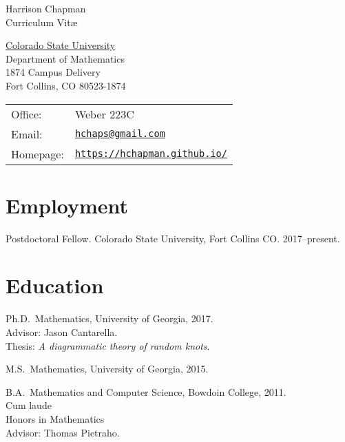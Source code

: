 \documentclass[letterpaper]{article}
\def\name{Harrison Chapman}
\renewenvironment{itemize}{
  \begin{list}{}{
    \setlength{\leftmargin}{1.5em}
  }
}{
  \end{list}
}
\begin{document}
{\huge \name}\\
{\large\sc Curriculum Vit\ae}


\vspace{0.25in}

\begin{minipage}{0.45\linewidth}
  \href{http://www.colostate.edu/}{Colorado State University} \\
  Department of Mathematics \\
  1874 Campus Delivery \\
  Fort Collins, CO 80523-1874
\end{minipage}
\begin{minipage}{0.45\linewidth}
  \begin{tabular}{ll}
    Office: & Weber 223C \\
    Email: & \href{mailto:hchaps@gmail.com}{\tt hchaps@gmail.com} \\
    Homepage: & \href{https://hchapman.github.io/}{\tt https://hchapman.github.io/} \\
  \end{tabular}
\end{minipage}

\section*{Employment}

\begin{itemize}
  \item Postdoctoral Fellow. Colorado State University, Fort Collins CO. 2017--present.
\end{itemize}

\section*{Education}

\begin{itemize}
\item Ph.D.\ Mathematics, University of Georgia, 2017.\\
  \textbullet \quad Advisor: Jason Cantarella.\\
  \textbullet \quad Thesis: \emph{A diagrammatic theory of random knots}.
\item M.S.\ Mathematics, University of Georgia, 2015.
\item B.A.\ Mathematics and Computer Science, Bowdoin College,
  2011.\\
  \textbullet \quad Cum laude \\
  \textbullet \quad Honors in Mathematics \\
  \textbullet \quad Advisor: Thomas Pietraho.
\end{itemize}
\end{document}
